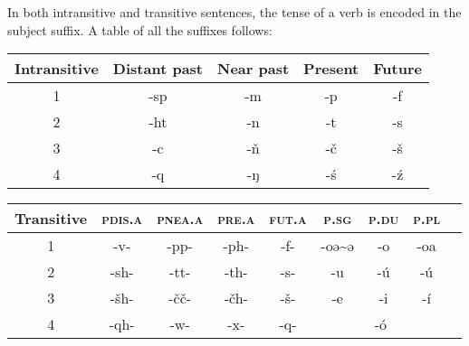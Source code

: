 \documentclass[11pt]{article} %
\begin{document}
In both intransitive and transitive sentences, the tense of a verb is encoded in the subject suffix. A table of all the suffixes follows:

\begin{center}
	\begin{tabular}{|c||c|c|c|c|}
				\hline
				\textbf{Intransitive} & Distant past & Near past   & Present & Future  \\ \hline\hline
				\textsc{1}            & -sp          & -m          & -p      & -f      \\ \hline
				\textsc{2}            & -ht          & -n          & -t      & -s      \\ \hline
				\textsc{3}            & -c           & -ň          & -č      & -š      \\ \hline
				\textsc{4}            & -q           & -ŋ          & -ś      & -ź      \\ \hline
	\end{tabular} 
\end{center}

\begin{center}
	\begin{tabular}{|c||c|c|c|c|c|c|c|c|}
				\hline
				\textbf{Transitive} & \textsc{pdis.a} & \textsc{pnea.a} & \textsc{pre.a} & \textsc{fut.a} & \textsc{p.sg}         & \textsc{p.du} & \textsc{p.pl}\\ \hline\hline
				\textsc{1}          & -v-             & -pp-            & -ph-           & -f-            & -oə\textasciitilde{}ə & -o            & -oa          \\ \hline
				\textsc{2}          & -sh-            & -tt-            & -th-           & -s-            & -u                    & -ú            & -ú           \\ \hline
				\textsc{3}          & -šh-            & -čč-            & -čh-           & -š-            & -e                    & -i            & -í           \\ \hline
				\textsc{4}          & -qh-            & -w-             & -x-            & -q-            & \multicolumn{3}{c|}{-ó}                              \\ \hline
	\end{tabular} 
\end{center}
\end{document}
